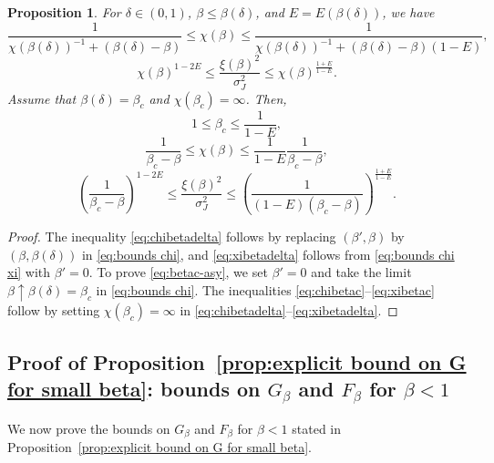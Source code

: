 \documentclass[11pt,a4paper]{article}
\numberwithin{equation}{section}
\theoremstyle{plain}
\newtheorem{Prop}[Thm]{Proposition}
\theoremstyle{definition}
\newcommand\1{\mathds{1}}
\begin{document}
\begin{Prop}
\label{prop:gamma-nu}
For $\delta \in(0,1)$, $\beta \le \beta(\delta)$, and   $E=E(\beta(\delta))$, we have
\begin{equation}
\label{eq:chibetadelta}
    \frac{1}{\chi(\beta(\delta))^{-1} + (\beta(\delta) -\beta)}
    \le \chi(\beta)
    \le
    \frac{1}{\chi(\beta(\delta))^{-1} + (\beta(\delta) -\beta)(1-E)},
\end{equation}
\begin{equation}
\label{eq:xibetadelta}
    \chi(\beta)^{1-2E}
    \le
    \frac{\xi(\beta)^2}{\sigma_J^2}
    \le
     \chi(\beta)^{\frac{1+E}{1-E}}.
\end{equation}
Assume that $\beta(\delta)=\beta_c$ and $\chi(\beta_c)=\infty$. Then,
 \begin{equation}
 \label{eq:betac-asy}
    1 \le \beta_c \le \frac{1}{1-E},
 \end{equation}
\begin{equation}
\label{eq:chibetac}
    \frac{1}{\beta_c  -\beta}
    \le \chi(\beta)
    \le
    \frac{1}{1-E}
    \frac{1}{\beta_c -\beta },
\end{equation}
\begin{equation}
\label{eq:xibetac}
    \left( \frac{1}{\beta_c -\beta} \right)^{1-2E}
    \le
    \frac{\xi(\beta)^2}{\sigma_J^2}
    \le
    \left( \frac{1}{(1-E)(\beta_c -\beta)} \right)^{\frac{1+E}{1-E}}.
\end{equation}
\end{Prop}

\begin{proof}
The inequality \eqref{eq:chibetadelta}
follows by replacing $(\beta',\beta)$ by $(\beta,\beta(\delta))$
in \eqref{eq:bounds chi},
and \eqref{eq:xibetadelta} follows from \eqref{eq:bounds chi xi} with $\beta'=0$.
To prove \eqref{eq:betac-asy}, we set $\beta'=0$ and
take the limit $\beta \uparrow \beta(\delta)=\beta_c$ in \eqref{eq:bounds chi}.
The inequalities \eqref{eq:chibetac}--\eqref{eq:xibetac} follow
by setting $\chi(\beta_c)=\infty$ in \eqref{eq:chibetadelta}--\eqref{eq:xibetadelta}.
\end{proof}


\subsection{Proof of Proposition~\ref{prop:explicit bound on G for small beta}: bounds on $G_\beta$ and $F_\beta$ for $\beta<1$}
\label{sec:smallbeta}

We now prove the bounds on $G_\beta$ and $F_\beta$ for $\beta<1$
stated in Proposition~\ref{prop:explicit bound on G for small beta}.
\end{document}
